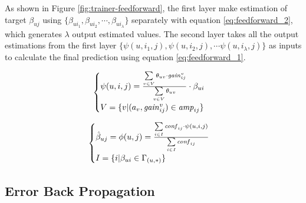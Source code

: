 As shown in Figure \ref{fig:trainer-feedforward}, the first layer make
estimation of target $\beta_{uj}$ using $\{\beta_{ui_1}, \beta_{ui_2},
\cdots, \beta_{ui_\lambda}\}$ separately with equation
\ref{eq:feedforward_2}, which generates $\lambda$ output estimated
values. The second layer takes all the output estimations from the
first layer $\{\psi(u,i_1,j),\psi(u,i_2,j),\cdots
\psi(u,i_\lambda,j)\}$ as inputs to calculate the final prediction
using equation \ref{eq:feedforward_1}.

\newcommand{\wconf}[3]{\sum\limits_{{#2}:\beta_{{#1}{#2}}\in\Gamma_{({#1},*)}} \confi{{#2}{#3}}\cdot \psi({#1},{#2},{#3})}
\newcommand{\sconf}[3]{\sum\limits_{{#2}:\beta_{{#1}{#2}}\in\Gamma_{({#1},*)}} \confi{{#2}{#3}}}

\newcommand{\wtheta}[2]{\sum \limits_{{#2}:(a_{#2},\gain{{#2}}{ij})\in\amp{ij}} \theta_{{#1}{#2}} \cdot \gain{{#2}}{ij}}
\newcommand{\stheta}[2]{\sum \limits_{{#2}:(a_{#2},\gain{{#2}}{ij})\in\amp{ij}} \theta_{{#1}{#2}}}

\begin{equation}
  \label{eq:feedforward_2}
  \begin{cases}   
    \psi (u,i,j) = \frac{\sum \limits_{v\in V} \theta_{uv} \cdot \gain{{v}}{ij}}{\sum \limits_{v\in V} \theta_{uv}} \cdot \beta_{ui} \\
    V=\{v|(a_{v},\gain{{v}}{ij})\in\amp{ij}\}
   \end{cases}
\end{equation}

\begin{equation}
  \label{eq:feedforward_1}
  \begin{cases}    \hat{\beta}_{uj}=\phi(u,j)=\frac{\sum\limits_{i\in I} \confi{ij}\cdot \psi(u,i,j)}{\sum\limits_{i\in I} \confi{ij}} \\
  	    I=\{i|\beta_{ui}\in\Gamma_{(u,*)}\}
  \end{cases}
\end{equation}

\subsection{Error Back Propagation}
\label{sec:bp}

